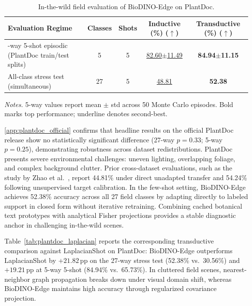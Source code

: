 \documentclass[preprint,12pt]{elsarticle}
\begin{document}
\begin{table}[htbp]
\caption{In-the-wild field evaluation of BioDINO-Edge on PlantDoc.}
\label{tab:plantdoc_context}
\centering
\footnotesize
\setlength{\tabcolsep}{4pt}
\begin{tabularx}{\columnwidth}{@{}>{\raggedright\arraybackslash}Xcccc@{}}
\toprule
\textbf{Evaluation Regime} & \textbf{Classes} & \textbf{Shots} & \textbf{Inductive (\%) ($\uparrow$)} & \textbf{Transductive (\%) ($\uparrow$)} \\
\midrule
5-way 5-shot episodic (PlantDoc train/test splits) & 5 & 5 & \underline{82.60$\pm$11.49} & \textbf{84.94$\pm$11.15} \\
All-class stress test (simultaneous) & 27 & 5 & \underline{48.81} & \textbf{52.38} \\
\bottomrule
\end{tabularx}

\vspace{3pt}
\begin{minipage}{\columnwidth}
\footnotesize
\textit{Notes.} 5-way values report mean $\pm$ std across 50 Monte Carlo episodes. Bold marks top performance; underline denotes second-best.
\end{minipage}
\end{table}

\ref{app:plantdoc_official} confirms that headline results on the official PlantDoc release show no statistically significant difference (27-way $p=0.33$; 5-way $p=0.25$), demonstrating robustness across dataset redistributions. PlantDoc presents severe environmental challenges: uneven lighting, overlapping foliage, and complex background clutter. Prior cross-dataset evaluations, such as the study by Zhao et al.~\cite{zhao2026lightweight}, report 44.81\% under direct unadapted transfer and 54.24\% following unsupervised target calibration. In the few-shot setting, BioDINO-Edge achieves 52.38\% accuracy across all 27 field classes by adapting directly to labeled support in closed form without iterative retraining. Combining cached botanical text prototypes with analytical Fisher projections provides a stable diagnostic anchor in challenging in-the-wild scenes.

Table~\ref{tab:plantdoc_laplacian} reports the corresponding transductive comparison against LaplacianShot on PlantDoc: BioDINO-Edge outperforms LaplacianShot by $+21.82$\,pp on the 27-way stress test (52.38\% vs.\ 30.56\%) and $+19.21$\,pp at 5-way 5-shot (84.94\% vs.\ 65.73\%). In cluttered field scenes, nearest-neighbor graph propagation breaks down under visual domain shift, whereas BioDINO-Edge maintains high accuracy through regularized covariance projection.
\end{document}
